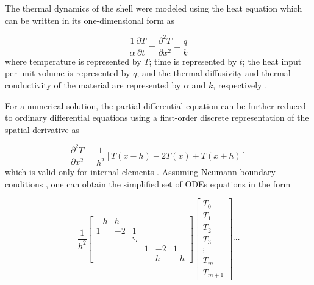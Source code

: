 \documentclass[a4paper, 10pt, conference]{ieeeconf}      %
\begin{document}
The thermal dynamics of the shell were modeled using the
heat equation which can be written in its one-dimensional form as

\[
\frac{1}{\alpha}\frac{\partial T}{\partial t}=\frac{\partial^{2}T}{\partial x^{2}}+\frac{\dot{q}}{k}
\]
where temperature is represented by $T$; time is represented by $t$;
the heat input per unit volume is represented by $\dot{q}$; and the
thermal diffusivity and thermal conductivity of the material are represented
by $\alpha$ and $k$, respectively \cite{Incropera1990}. 

For a numerical solution, the partial differential equation can be further
reduced to ordinary differential equations using a first-order discrete
representation \cite{LeVeque2007} of the spatial derivative as

\[
\frac{\partial^{2}T}{\partial x^{2}}=\frac{1}{h^{2}}\left[T\left(x-h\right)-2T\left(x\right)+T\left(x+h\right)\right]
\]
which is valid only for internal elements . Assuming Neumann
boundary conditions \cite{LeVeque2007}, one can obtain the simplified set of ODEs equations
in the form

\[
\frac{1}{h^{2}}\left[\begin{array}{cccccc}
-h & h\\
1 & -2 & 1\\
 &  & \ddots\\
 &  &  & 1 & -2 & 1\\
 &  &  &  & h & -h
\end{array}\right]\left[\begin{array}{c}
T_{0}\\
T_{1}\\
T_{2}\\
T_{3}\\
\vdots\\
T_{m}\\
T_{m+1}
\end{array}\right]\cdots
\]
\end{document}

